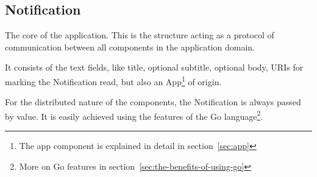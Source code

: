 \subsection{Notification}\label{sec:notification}

The core of the application.
This is the structure
acting as a protocol of communication
between all components in the application domain.

It consists of the text fields,
like title, optional subtitle, optional body,
URIs for marking the Notification read,
but also an App\footnote{
  The app component is explained in detail in section~\ref{sec:app}
} of origin.

For the distributed nature of the components,
the Notification is always passed by value.
It is easily achieved
using the features of
the Go language\footnote{
  More on Go features in section~\ref{sec:the-benefits-of-using-go}
}.

